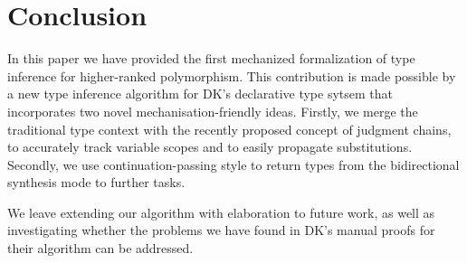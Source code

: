 \section{Conclusion}

In this paper we have provided the first mechanized formalization of type
inference for higher-ranked polymorphism. This contribution is made possible by
a new type inference algorithm for DK's declarative type sytsem that
incorporates two novel mechanisation-friendly ideas. Firstly, we merge the
traditional type context with the recently proposed concept of judgment chains,
to accurately track variable scopes and to easily propagate substitutions.
Secondly, we use continuation-passing style to return types from the
bidirectional synthesis mode to further tasks. 

We leave extending our algorithm with elaboration to future work, as well as
investigating whether the problems we have found in DK's manual proofs for
their algorithm can be addressed.

